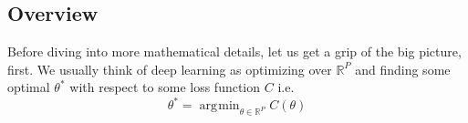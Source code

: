\documentclass{article}
\theoremstyle{plain}
\theoremstyle{definition}
\theoremstyle{remark}
\newtheorem{remark}{Remark}
\DeclareMathOperator*{\argmin}{\arg\!\min}
\begin{document}
%
%
%
%
%


\subsection{Overview}
Before diving into more mathematical details, let us get a grip of the big picture, first.
We usually think of deep learning as optimizing over $\mathbb{R}^P$ and finding some optimal $\theta^*$ with respect to some loss function $C$ i.e.
\begin{equation}
	\theta^* = \argmin_{\theta \in \mathbb{R}^P} C(\theta)
\end{equation}
\end{document}
